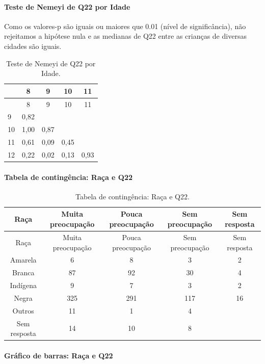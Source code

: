 \documentclass[]{article}
\let\oldparagraph\paragraph
\renewcommand{\paragraph}[1]{\oldparagraph{#1}\mbox{}}
\begin{document}
\hypertarget{teste-de-nemeyi-de-q22-por-idade}{%
\paragraph{Teste de Nemeyi de Q22 por Idade}\label{teste-de-nemeyi-de-q22-por-idade}}

Como os valores-p são iguais ou maiores que 0.01 (nível de significância), não rejeitamos a hipótese nula e as medianas de Q22 entre as crianças de diversas cidades são iguais.

\begin{longtable}[]{@{}lcccc@{}}
\caption{\label{tab:unnamed-chunk-513}Teste de Nemeyi de Q22 por Idade.}\tabularnewline
\toprule
& 8 & 9 & 10 & 11\tabularnewline
\midrule
\endfirsthead
\toprule
& 8 & 9 & 10 & 11\tabularnewline
\midrule
\endhead
9 & 0,82 & & &\tabularnewline
10 & 1,00 & 0,87 & &\tabularnewline
11 & 0,61 & 0,09 & 0,45 &\tabularnewline
12 & 0,22 & 0,02 & 0,13 & 0,93\tabularnewline
\bottomrule
\end{longtable}

\cleardoublepage

\hypertarget{tabela-de-continguxeancia-rauxe7a-e-q22}{%
\paragraph{Tabela de contingência: Raça e Q22}\label{tabela-de-continguxeancia-rauxe7a-e-q22}}

\begin{longtable}[]{@{}ccccc@{}}
\caption{\label{tab:unnamed-chunk-514}Tabela de contingência: Raça e Q22.}\tabularnewline
\toprule
Raça & Muita preocupação & Pouca preocupação & Sem preocupação & Sem resposta\tabularnewline
\midrule
\endfirsthead
\toprule
Raça & Muita preocupação & Pouca preocupação & Sem preocupação & Sem resposta\tabularnewline
\midrule
\endhead
Amarela & 6 & 8 & 3 & 2\tabularnewline
Branca & 87 & 92 & 30 & 4\tabularnewline
Indígena & 9 & 7 & 3 & 2\tabularnewline
Negra & 325 & 291 & 117 & 16\tabularnewline
Outros & 11 & 1 & 4 &\tabularnewline
Sem resposta & 14 & 10 & 8 &\tabularnewline
\bottomrule
\end{longtable}

\hypertarget{gruxe1fico-de-barras-rauxe7a-e-q22}{%
\paragraph{Gráfico de barras: Raça e Q22}\label{gruxe1fico-de-barras-rauxe7a-e-q22}}
\end{document}
